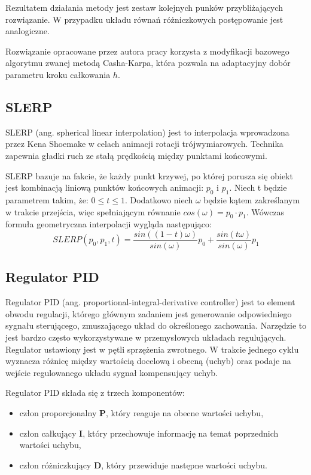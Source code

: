 \documentclass[12pt, twoside, openany]{report}
\theoremstyle{definition}
\begin{document}
Rezultatem działania metody jest zestaw kolejnych punków przybliżających rozwiązanie. W przypadku układu równań różniczkowych postępowanie jest analogiczne. 

Rozwiązanie opracowane przez autora pracy korzysta z modyfikacji bazowego algorytmu zwanej metodą Casha-Karpa, która pozwala na adaptacyjny dobór parametru kroku całkowania \(h\).

\subsection{SLERP}
\label{SLERP}
SLERP (ang. spherical linear interpolation) jest to interpolacja wprowadzona przez Kena Shoemake w celach animacji rotacji trójwymiarowych. Technika zapewnia gładki ruch ze stałą prędkością między punktami końcowymi.

SLERP bazuje na fakcie, że każdy punkt krzywej, po której porusza się obiekt jest kombinacją liniową punktów końcowych animacji: $p_0$ i $p_1$. Niech t będzie parametrem takim, że: $0 \leqslant t \leqslant 1$. Dodatkowo niech $\omega$ będzie kątem zakreślanym w trakcie przejścia, więc spełniającym równanie $cos(\omega) = p_0 \cdot p_1$.
Wówczas formuła geometryczna interpolacji wygląda następująco:
\begin{equation*}
SLERP(p_0, p_1, t) = \frac{sin((1-t)\omega)}{sin(\omega)} p_0 + \frac{sin(t\omega)}{sin(\omega)} p_1
\end{equation*}

\subsection{Regulator PID}
\label{PIDSection}
Regulator PID (ang. proportional-integral-derivative controller) jest to element obwodu regulacji, którego głównym zadaniem jest generowanie odpowiedniego sygnału sterującego, zmuszającego układ do określonego zachowania. Narzędzie to jest bardzo często wykorzystywane w przemysłowych układach regulujących. Regulator ustawiony jest w pętli sprzężenia zwrotnego. W trakcie jednego cyklu wyznacza różnicę między wartością docelową i obecną (uchyb) oraz podaje na wejście regulowanego układu sygnał kompensujący uchyb.


 Regulator PID składa się z trzech komponentów:
\begin{itemize}
\item człon proporcjonalny \textbf{P}, który reaguje na obecne wartości uchybu,
\item człon całkujący \textbf{I}, który przechowuje informację na temat poprzednich wartości uchybu,
\item człon różniczkujący \textbf{D}, który przewiduje następne wartości uchybu.
\end{itemize}
\end{document}

